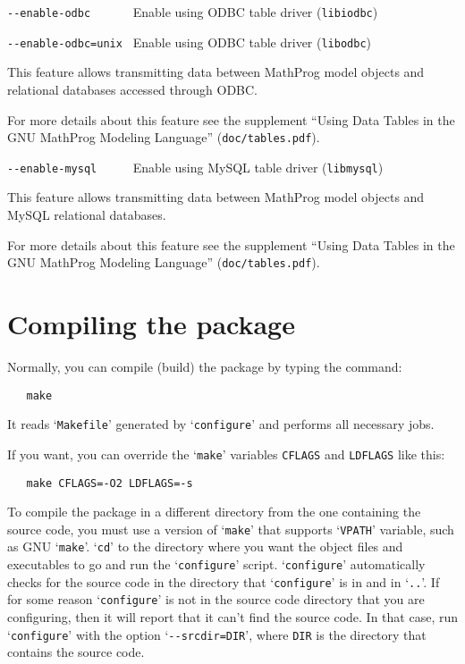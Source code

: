 \bigskip

\noindent
\verb|--enable-odbc      |
Enable using ODBC table driver (\verb|libiodbc|)

\noindent
\verb|--enable-odbc=unix |
Enable using ODBC table driver (\verb|libodbc|)

\medskip

This feature allows transmitting data between MathProg model objects
and relational databases accessed through ODBC.

For more details about this feature see the supplement ``Using Data
Tables in the GNU MathProg Modeling Language'' (\verb|doc/tables.pdf|).

\bigskip

\noindent
\verb|--enable-mysql     |
Enable using MySQL table driver (\verb|libmysql|)

\medskip

This feature allows transmitting data between MathProg model objects
and MySQL relational databases.

For more details about this feature see the supplement ``Using Data
Tables in the GNU MathProg Modeling Language'' (\verb|doc/tables.pdf|).

\section{Compiling the package}

Normally, you can compile (build) the package by typing the command:

\begin{verbatim}
   make
\end{verbatim}

\noindent
It reads `\verb|Makefile|' generated by `\verb|configure|' and performs
all necessary jobs.

If you want, you can override the `\verb|make|' variables \verb|CFLAGS|
and \verb|LDFLAGS| like this:

\begin{verbatim}
   make CFLAGS=-O2 LDFLAGS=-s
\end{verbatim}

To compile the package in a different directory from the one containing
the source code, you must use a version of `\verb|make|' that supports
`\verb|VPATH|' variable, such as GNU `\verb|make|'. `\verb|cd|' to the
directory where you want the object files and executables to go and run
the `\verb|configure|' script. `\verb|configure|' automatically checks
for the source code in the directory that `\verb|configure|' is in and
in `\verb|..|'. If for some reason `\verb|configure|' is not in the
source code directory that you are configuring, then it will report that
it can't find the source code. In that case, run `\verb|configure|' with
the option `\verb|--srcdir=DIR|', where \verb|DIR| is the directory that
contains the source code.

